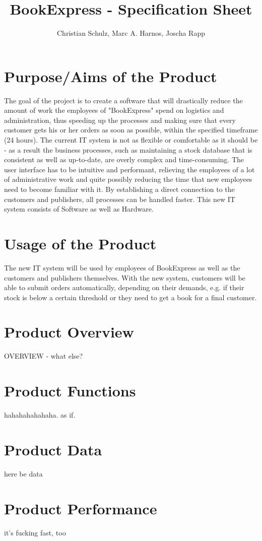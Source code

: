 \documentclass[a4paper]{report}
\author{Christian Schulz, Marc A. Harnos, Joscha Rapp}
\begin{document}
\title{BookExpress - Specification Sheet}
\maketitle
\tableofcontents

\chapter{Purpose/Aims of the Product}
The goal of the project is to create a software that will drastically reduce the amount of work the employees of "BookExpress" spend on logistics and administration, thus speeding up the processes and making sure that every customer gets his or her orders as soon as possible, within the specified timeframe (24 hours). The current IT system is not as flexible or comfortable as it should be - as a result the business processes, such as maintaining a stock database that is consistent as well as up-to-date, are overly complex and time-consuming. The user interface has to be intuitive and performant, relieving the employees of a lot of administrative work and quite possibly reducing the time that new employees need to become familiar with it. By establishing a direct connection to the customers and publishers, all processes can be handled faster. This new IT system consists of Software as well as Hardware. 
\\
\chapter{Usage of the Product}
The new IT system will be used by employees of BookExpress as well as the customers and publishers themselves. With the new system, customers will be able to submit orders automatically, depending on their demands, e.g. if their stock is below a certain threshold or they need to get a book for a final customer. 
\\	
\chapter{Product Overview}
OVERVIEW - what else?
\\
\chapter{Product Functions}
hahahahahahaha. as if.
\\
\chapter{Product Data}
here be data
\\
\chapter{Product Performance}
it's fucking fast, too
\end{document}
